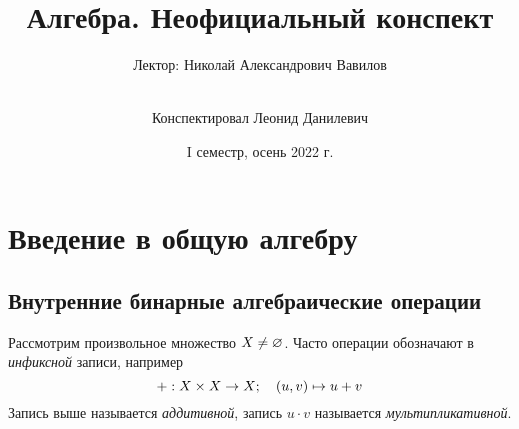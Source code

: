 \documentclass[a4paper]{report}
\date{I семестр, осень 2022 г.}
\title{Алгебра. Неофициальный конспект}
\author{Лектор: Николай Александрович Вавилов \and \\ Конспектировал Леонид Данилевич}
\begin{document}
    \maketitle
    \tableofcontents
    \newpage
    \setcounter{lection}{0}


    \chapter{Введение в общую алгебру}


    \section{Внутренние бинарные алгебраические операции}
    Рассмотрим произвольное множество $X \ne \varnothing$.
    Часто операции обозначают в \textit{инфиксной} записи, например \[+: X \times X \rightarrow X; \quad(u, v) \mapsto u + v\]
    Запись выше называется \textit{аддитивной}, запись $u \cdot v$ называется \textit{мультипликативной}.
\end{document}
